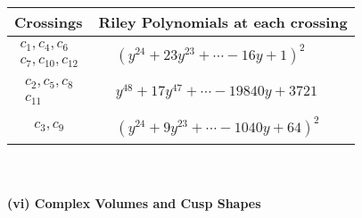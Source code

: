 \documentclass[1p]{elsarticle_modified}
\theoremstyle{definition}
\begin{document}
\begin{tabular}{m{50pt}|m{274pt}}
Crossings & \hspace{64pt}Riley Polynomials at each crossing \\
\hline $$\begin{aligned}c_{1},c_{4},c_{6}\\c_{7},c_{10},c_{12}\end{aligned}$$&$\begin{aligned}
&(y^{24}+23 y^{23}+\cdots-16 y+1)^{2}
\end{aligned}$\\
\hline $$\begin{aligned}c_{2},c_{5},c_{8}\\c_{11}\end{aligned}$$&$\begin{aligned}
&y^{48}+17 y^{47}+\cdots-19840 y+3721
\end{aligned}$\\
\hline $$\begin{aligned}c_{3},c_{9}\end{aligned}$$&$\begin{aligned}
&(y^{24}+9 y^{23}+\cdots-1040 y+64)^{2}
\end{aligned}$\\
\hline
\end{tabular}\\~\\
\newpage\flushleft \textbf{(vi) Complex Volumes and Cusp Shapes}
\end{document}
